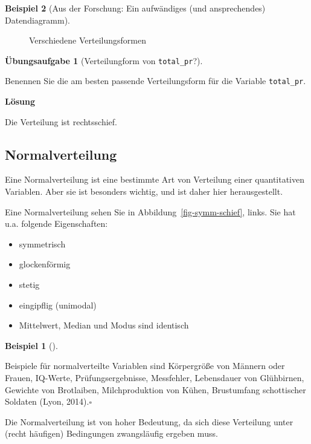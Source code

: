 \documentclass[
  a4paper,
]{scrbook}
\providecommand{\tightlist}{%
  \setlength{\itemsep}{0pt}\setlength{\parskip}{0pt}}\usepackage{longtable,booktabs,array}
\theoremstyle{definition}
\newtheorem{example}{Beispiel}[chapter]
\theoremstyle{definition}
\theoremstyle{definition}
\newtheorem{exercise}{Übungsaufgabe}[chapter]
\theoremstyle{remark}
\begin{document}
\begin{example}[Aus der Forschung: Ein aufwändiges (und ansprechendes)
Datendiagramm]
\begin{figure}
{}

\caption{\label{fig-plot-distribs}Verschiedene Verteilungsformen}

\end{figure}%

\begin{exercise}[Verteilungform von
\texttt{total\_pr}?]\protect\hypertarget{exr-verteilungsform-total-pr}{}\label{exr-verteilungsform-total-pr}

Benennen Sie die am besten passende Verteilungsform für die Variable
\texttt{total\_pr}.

\textbf{Lösung}

Die Verteilung ist rechtsschief.

\end{exercise}

\subsection{Normalverteilung}\label{normalverteilung}

Eine Normalverteilung ist eine bestimmte Art von Verteilung einer
quantitativen Variablen. Aber sie ist besonders wichtig, und ist daher
hier herausgestellt.

Eine Normalverteilung sehen Sie in Abbildung~\ref{fig-symm-schief},
links. Sie hat u.a. folgende Eigenschaften:

\begin{itemize}
\tightlist
\item
  symmetrisch
\item
  glockenförmig
\item
  stetig
\item
  eingipflig (unimodal)
\item
  Mittelwert, Median und Modus sind identisch
\end{itemize}

\begin{example}[]\protect\hypertarget{exm-norm}{}\label{exm-norm}

Beispiele für normalverteilte Variablen sind Körpergröße von Männern
oder Frauen, IQ-Werte, Prüfungsergebnisse, Messfehler, Lebensdauer von
Glühbirnen, Gewichte von Brotlaiben, Milchproduktion von Kühen,
Brustumfang schottischer Soldaten (Lyon, 2014).\(\square\)

\end{example}

Die Normalverteilung ist von hoher Bedeutung, da sich diese Verteilung
unter (recht häufigen) Bedingungen zwangsläufig ergeben muss.


\end{example}
\end{document}
